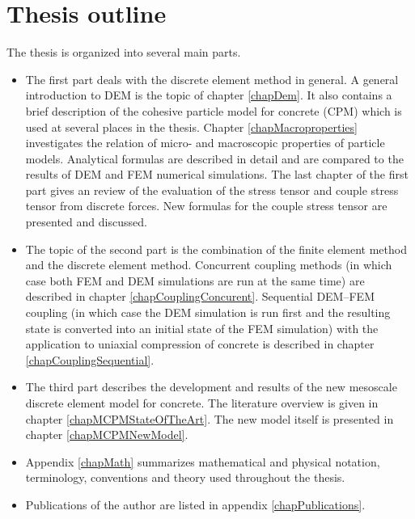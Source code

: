 \section{Thesis outline}
The thesis is organized into several main parts.
\begin{itemize}

\item
The first part deals with the discrete element method in general.
%
A general introduction to DEM is the topic of chapter \ref{chapDem}.
It also contains a brief description of the cohesive particle model for concrete (CPM) which is used at several places in the thesis.
%
Chapter \ref{chapMacroproperties} investigates the relation of micro- and macroscopic properties of particle models.
Analytical formulas are described in detail and are compared to the results of DEM and FEM numerical simulations.
%
The last chapter of the first part gives an review of the evaluation of the stress tensor and couple stress tensor from discrete forces.
New formulas for the couple stress tensor are presented and discussed.

\item
The topic of the second part is the combination of the finite element method and the discrete element method.
Concurrent coupling methods (in which case both FEM and DEM simulations are run at the same time) are described in chapter \ref{chapCouplingConcurent}.
Sequential DEM--FEM coupling (in which case the DEM simulation is run first and the resulting state is converted into an initial state of the FEM simulation) with the application to uniaxial compression of concrete is described in chapter \ref{chapCouplingSequential}.

\item
The third part describes the development and results of the new mesoscale discrete element model for concrete.
The literature overview is given in chapter \ref{chapMCPMStateOfTheArt}.
The new model itself is presented in chapter \ref{chapMCPMNewModel}.

\item
Appendix \ref{chapMath} summarizes
mathematical and physical
notation,
terminology,
conventions
and
 theory
used throughout the thesis.

\item
Publications of the author are listed in appendix \ref{chapPublications}.
\end{itemize}
